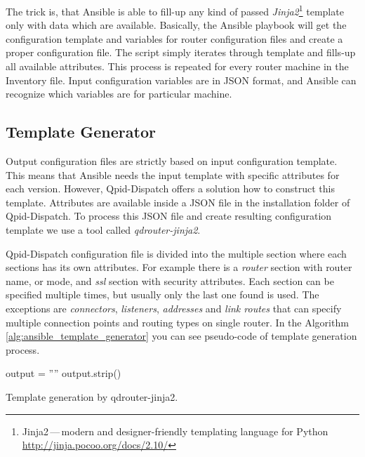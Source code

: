 The trick is, that Ansible is able to fill-up any kind of passed \emph{Jinja2}\footnote{Jinja2\,---\,modern and designer-friendly templating language for Python \url{http://jinja.pocoo.org/docs/2.10/}} template only with data which are available. Basically, the Ansible playbook will get the configuration template and variables for router configuration files and create a proper configuration file. The script simply iterates through template and fills-up all available attributes. This process is repeated for every router machine in the Inventory file. Input configuration variables are in JSON format, and Ansible can recognize which variables are for particular machine.

\subsection{Template Generator}
Output configuration files are strictly based on input configuration template. This means that Ansible needs the input template with specific attributes for each version. However, Qpid-Dispatch offers a solution how to construct this template. Attributes are available inside a JSON file in the installation folder of Qpid-Dispatch. To process this JSON file and create resulting configuration template we use a tool called \emph{qdrouter-jinja2}\footnotemark{}.


Qpid-Dispatch configuration file is divided into the multiple section where each sections has its own attributes. For example there is a \emph{router} section with router name, or mode, and \emph{ssl} section with security attributes. Each section can be specified multiple times, but usually only the last one found is used. The exceptions are \emph{connectors}, \emph{listeners}, \emph{addresses} and \emph{link routes} that can specify multiple connection points and routing types on single router. In the Algorithm \ref{alg:ansible_template_generator} you can see pseudo-code of template generation process.

\begin{center}
	\begin{algorithm}[H]
		\LinesNumbered
		\DontPrintSemicolon


		\var output = ''''\;
		output.strip()\;
		\caption{Template generation by qdrouter-jinja2.}
		\label{alg:ansible_template_generator}
	\end{algorithm}
\end{center}

